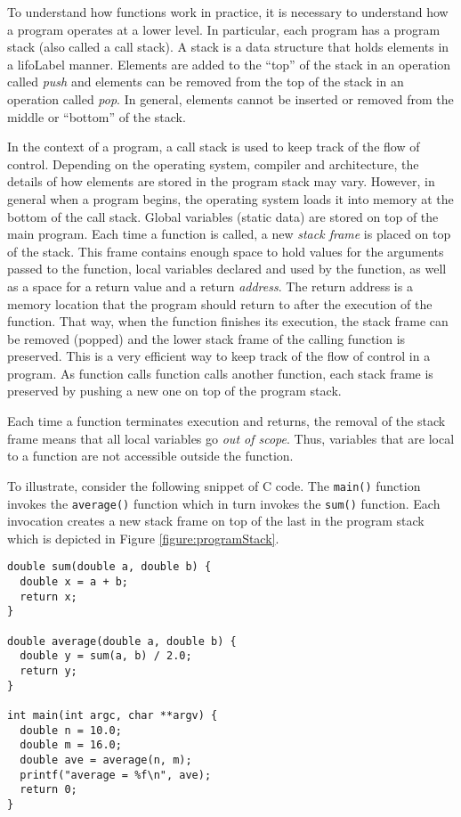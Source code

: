 To understand how functions work in practice, it is necessary to 
understand how a program operates at a lower level.  In particular,
each program has a \gls{program stack} (also called a call stack).  
A \gls{stack} is a data structure that holds elements in a \gls{lifoLabel}
manner.  Elements are added to the ``top'' of the stack in an operation
called \emph{push} and elements can be removed from the top
of the stack in an operation called \emph{pop}.  In general, elements 
cannot be inserted or removed from the middle or ``bottom'' of the 
stack.

In the context of a program, a call stack is used to keep track of the 
flow of control.  Depending on the operating system, compiler and architecture, 
the details of how elements are stored in the program stack may 
vary.  However, in general when a program begins, the operating 
system loads it into memory at the bottom of the call stack.  Global 
variables (static data) are stored on top of the main program.  Each
time a function is called, a new \emph{stack frame} is placed on
top of the stack.  This frame contains enough space to hold values
for the arguments passed to the function, local variables declared
and used by the function, as well as a space for a return value and
a return \emph{address}.  The return address is a memory location
that the program should return to after the execution of the function.
That way, when the function finishes its execution, the stack frame
can be removed (popped) and the lower stack frame of the calling
function is preserved.  This is a very efficient way to keep track of
the flow of control in a program.  As function calls function calls
another function, each stack frame is preserved by pushing a new
one on top of the program stack.

Each time a function terminates execution and returns, the removal
of the stack frame means that all local variables go \emph{out of
scope}.  Thus, variables that are local to a function are not accessible
outside the function.

To illustrate, consider the following snippet of C code.  The \texttt{main()}
function invokes the \texttt{average()} function which in 
turn invokes the \texttt{sum()} function.  Each invocation 
creates a new stack frame on top of the last in the program stack
which is depicted in Figure \ref{figure:programStack}.

\begin{verbatim}
double sum(double a, double b) {
  double x = a + b;
  return x;
}

double average(double a, double b) {
  double y = sum(a, b) / 2.0;
  return y;
}

int main(int argc, char **argv) {
  double n = 10.0;
  double m = 16.0;
  double ave = average(n, m);
  printf("average = %f\n", ave);
  return 0;
}
\end{verbatim}

